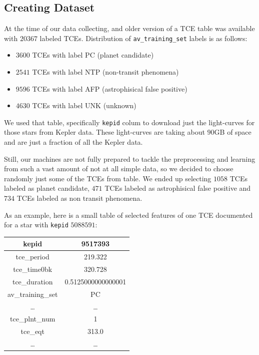 \documentclass[twoside]{article}
\newcommand{\code}[1]{\texttt{#1}}
\begin{document}
\begin{multicols}{2}
\subsection{Creating Dataset}
At the time of our data collecting, and older version of a TCE table was available with $20367$ labeled TCEs. Distribution of \code{av\_training\_set} labels is as follows:
\begin{itemize}
	\item $3600$ TCEs with label PC (planet candidate)
    \item $2541$ TCEs with label NTP (non-transit phenomena)
    \item $9596$ TCEs with label AFP (astrophisical false positive)
    \item $4630$ TCEs with label UNK (unknown)
\end{itemize}
We used that table, specifically \code{kepid} colum to download just the light-curves for those stars from Kepler data. These light-curves are taking about $90$GB of space and are just a fraction of all the Kepler data.

Still, our machines are not fully prepared to tackle the preprocessing and learning from such a vast amount of not at all simple data, so we decided to choose randomly just some of the TCEs from table. We ended up selecting $1058$ TCEs labeled as planet candidate, $471$ TCEs labeled as astrophisical false positive and $734$ TCEs labeled as non transit phenomena.

As an example, here is a small table of selected features of one TCE documented for a star with \code{kepid} $5088591$:
\begin{center}
  \begin{tabular}{||c | c||} 
    \hline
    kepid & 9517393 \\
    \hline
    tce\_period & 219.322 \\
    \hline
    tce\_time0bk & 320.728 \\
    \hline
    tce\_duration & 0.5125000000000001 \\
    \hline
    av\_training\_set & PC \\
    \hline
    \ldots & \ldots \\
    \hline
    tce\_plnt\_num & 1 \\
    \hline
    tce\_eqt & 313.0 \\
    \hline
    \ldots & \ldots
  \end{tabular}
\end{center}


\end{multicols}
\end{document}

